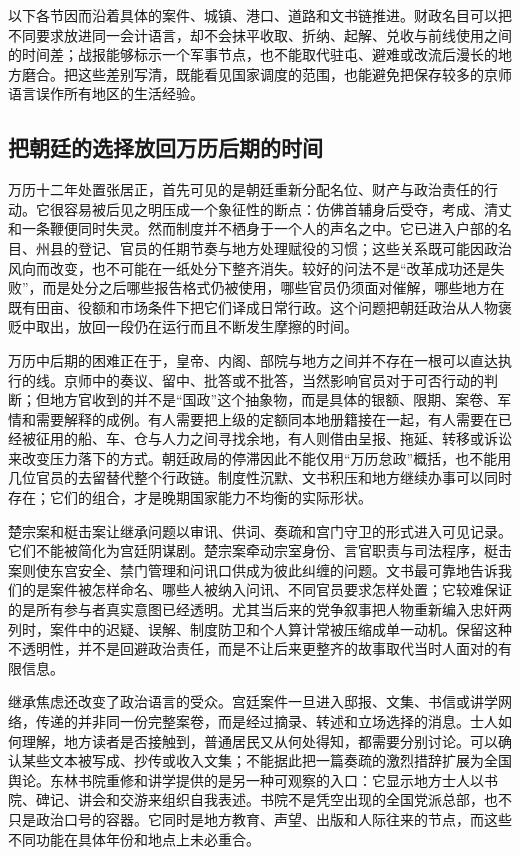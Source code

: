 以下各节因而沿着具体的案件、城镇、港口、道路和文书链推进。财政名目可以把不同要求放进同一会计语言，却不会抹平收取、折纳、起解、兑收与前线使用之间的时间差；战报能够标示一个军事节点，也不能取代驻屯、避难或改流后漫长的地方磨合。把这些差别写清，既能看见国家调度的范围，也能避免把保存较多的京师语言误作所有地区的生活经验。

\subsection{把朝廷的选择放回万历后期的时间}

万历十二年处置张居正，首先可见的是朝廷重新分配名位、财产与政治责任的行动。它很容易被后见之明压成一个象征性的断点：仿佛首辅身后受夺，考成、清丈和一条鞭便同时失灵。然而制度并不栖身于一个人的声名之中。它已进入户部的名目、州县的登记、官员的任期节奏与地方处理赋役的习惯；这些关系既可能因政治风向而改变，也不可能在一纸处分下整齐消失。较好的问法不是“改革成功还是失败”，而是处分之后哪些报告格式仍被使用，哪些官员仍须面对催解，哪些地方在既有田亩、役额和市场条件下把它们译成日常行政。这个问题把朝廷政治从人物褒贬中取出，放回一段仍在运行而且不断发生摩擦的时间。

万历中后期的困难正在于，皇帝、内阁、部院与地方之间并不存在一根可以直达执行的线。京师中的奏议、留中、批答或不批答，当然影响官员对于可否行动的判断；但地方官收到的并不是“国政”这个抽象物，而是具体的银额、限期、案卷、军情和需要解释的成例。有人需要把上级的定额同本地册籍接在一起，有人需要在已经被征用的船、车、仓与人力之间寻找余地，有人则借由呈报、拖延、转移或诉讼来改变压力落下的方式。朝廷政局的停滞因此不能仅用“万历怠政”概括，也不能用几位官员的去留替代整个行政链。制度性沉默、文书积压和地方继续办事可以同时存在；它们的组合，才是晚期国家能力不均衡的实际形状。

楚宗案和梃击案让继承问题以审讯、供词、奏疏和宫门守卫的形式进入可见记录。它们不能被简化为宫廷阴谋剧。楚宗案牵动宗室身份、言官职责与司法程序，梃击案则使东宫安全、禁门管理和问讯口供成为彼此纠缠的问题。文书最可靠地告诉我们的是案件被怎样命名、哪些人被纳入问讯、不同官员要求怎样处置；它较难保证的是所有参与者真实意图已经透明。尤其当后来的党争叙事把人物重新编入忠奸两列时，案件中的迟疑、误解、制度防卫和个人算计常被压缩成单一动机。保留这种不透明性，并不是回避政治责任，而是不让后来更整齐的故事取代当时人面对的有限信息。

继承焦虑还改变了政治语言的受众。宫廷案件一旦进入邸报、文集、书信或讲学网络，传递的并非同一份完整案卷，而是经过摘录、转述和立场选择的消息。士人如何理解，地方读者是否接触到，普通居民又从何处得知，都需要分别讨论。可以确认某些文本被写成、抄传或收入文集；不能据此把一篇奏疏的激烈措辞扩展为全国舆论。东林书院重修和讲学提供的是另一种可观察的入口：它显示地方士人以书院、碑记、讲会和交游来组织自我表述。书院不是凭空出现的全国党派总部，也不只是政治口号的容器。它同时是地方教育、声望、出版和人际往来的节点，而这些不同功能在具体年份和地点上未必重合。

